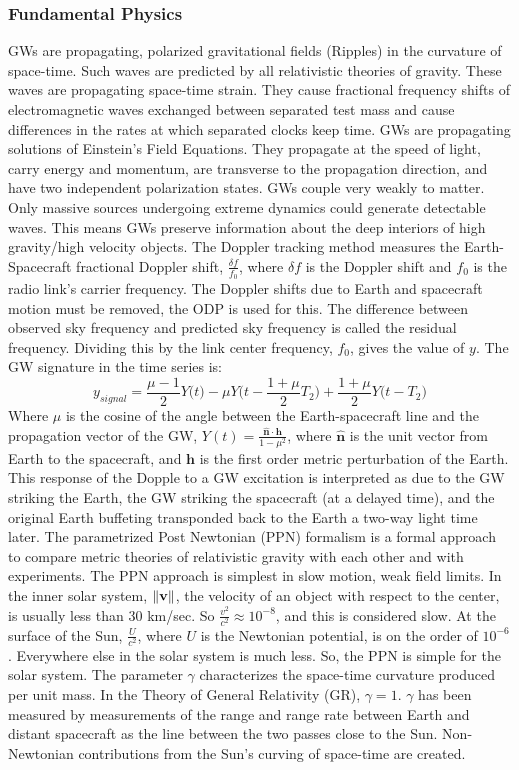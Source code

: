 \documentclass{article}
\theoremstyle{mystyle}
\begin{document}
\subsubsection{Fundamental Physics}

\noindent GWs are propagating, polarized gravitational fields (Ripples) in the curvature of space-time. Such waves are predicted by all relativistic theories of gravity. These waves are propagating space-time strain. They cause fractional frequency shifts of electromagnetic waves exchanged between separated test mass and cause differences in the rates at which separated clocks keep time. GWs are propagating solutions of Einstein's Field Equations. They propagate at the speed of light, carry energy and momentum, are transverse to the propagation direction, and have two independent polarization states. GWs couple very weakly to matter. Only massive sources undergoing extreme dynamics could generate detectable waves. This means GWs preserve information about the deep interiors of high gravity/high velocity objects. The Doppler tracking method measures the Earth-Spacecraft fractional Doppler shift, $\frac{\delta f}{f_0}$, where $\delta f$ is the Doppler shift and $f_0$ is the radio link's carrier frequency. The Doppler shifts due to Earth and spacecraft motion must be removed, the ODP is used for this. The difference between observed sky frequency and predicted sky frequency is called the residual frequency. Dividing this by the link center frequency, $f_0$, gives the value of $y$. The GW signature in the time series is:
\begin{equation}
y_{signal} = \frac{\mu-1}{2}Y\big(t\big)- \mu Y\big(t-\frac{1+\mu}{2}T_2\big)+\frac{1+\mu}{2}Y\big(t-T_2\big)
\end{equation}
Where $\mu$ is the cosine of the angle between the Earth-spacecraft line and the propagation vector of the GW, $Y(t) = \frac{\hat{\mathbf{n}}\cdot \mathbf{h}}{1-\mu^2}$, where $\hat{\mathbf{n}}$ is the unit vector from Earth to the spacecraft, and $\mathbf{h}$ is the first order metric perturbation of the Earth. This response of the Dopple to a GW excitation is interpreted as due to the GW striking the Earth, the GW striking the spacecraft (at a delayed time), and the original Earth buffeting transponded back to the Earth a two-way light time later. The parametrized Post Newtonian (PPN) formalism is a formal approach to compare metric theories of relativistic gravity with each other and with experiments. The PPN approach is simplest in slow motion, weak field limits. In the inner solar system, $\norm{\mathbf{v}}$, the velocity of an object with respect to the center, is usually less than 30 km/sec. So $\frac{v^2}{c^2} \approx 10^{-8}$, and this is considered slow. At the surface of the Sun, $\frac{U}{c^2}$, where $U$ is the Newtonian potential, is on the order of $10^{-6}$. Everywhere else in the solar system is much less. So, the PPN is simple for the solar system. The parameter $\gamma$ characterizes the space-time curvature produced per unit mass. In the Theory of General Relativity (GR), $\gamma=1$. $\gamma$ has been measured by measurements of the range and range rate between Earth and distant spacecraft as the line between the two passes close to the Sun. Non-Newtonian contributions from the Sun's curving of space-time are created. 
\end{document}
